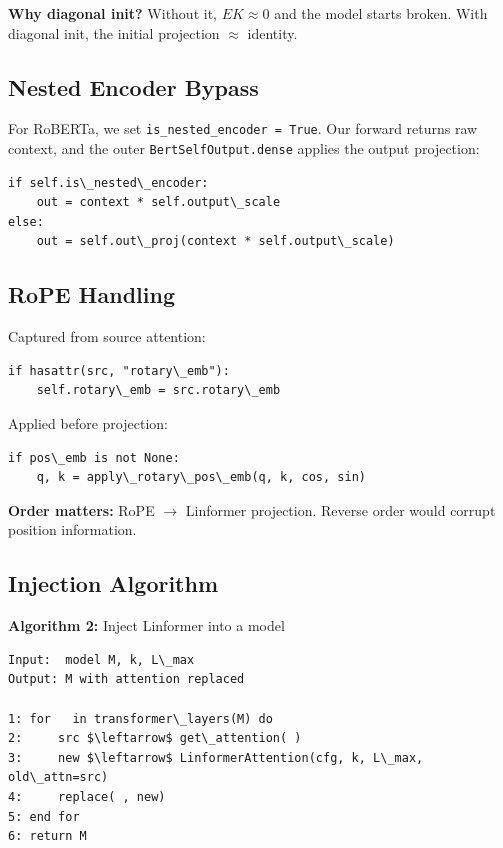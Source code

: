 \textbf{Why diagonal init?} Without it, $E K \approx 0$ and the model starts 
broken. With diagonal init, the initial projection $\approx$ identity.

\subsection{Nested Encoder Bypass}

For RoBERTa, we set \texttt{is\_nested\_encoder = True}. Our forward returns raw 
context, and the outer \texttt{BertSelfOutput.dense} applies the output projection:

\begin{lstlisting}
if self.is\_nested\_encoder:
    out = context * self.output\_scale
else:
    out = self.out\_proj(context * self.output\_scale)
\end{lstlisting}

\subsection{RoPE Handling}

Captured from source attention:

\begin{lstlisting}
if hasattr(src, "rotary\_emb"):
    self.rotary\_emb = src.rotary\_emb
\end{lstlisting}

Applied before projection:

\begin{lstlisting}
if pos\_emb is not None:
    q, k = apply\_rotary\_pos\_emb(q, k, cos, sin)
\end{lstlisting}

\textbf{Order matters:} RoPE $\to$ Linformer projection. Reverse order would corrupt 
position information.

\subsection{Injection Algorithm}

\textbf{Algorithm 2:} Inject Linformer into a model
\begin{lstlisting}
Input:  model M, k, L\_max
Output: M with attention replaced

1: for   in transformer\_layers(M) do
2:     src $\leftarrow$ get\_attention( )
3:     new $\leftarrow$ LinformerAttention(cfg, k, L\_max, old\_attn=src)
4:     replace( , new)
5: end for
6: return M
\end{lstlisting}

